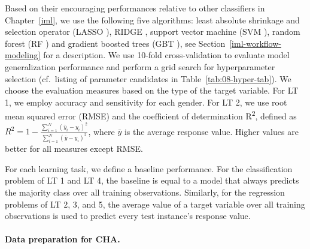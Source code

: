 \documentclass[
  oneside]{book}
\begin{document}
Based on their encouraging performances relative to other classifiers in Chapter~\ref{iml}, we use the following five algorithms:
least absolute shrinkage and selection operator (LASSO \autocite{lasso}),
RIDGE \autocite{ridge}, support vector machine (SVM \autocite{Boser:SVM1992}), random forest (RF \autocite{Breiman:RandomForests2001}) and gradient boosted trees (GBT \autocite{Friedman:PDP2001}), see Section~\ref{iml-workflow-modeling} for a description.
We use 10-fold cross-validation to evaluate model generalization performance and perform a grid search for hyperparameter selection (cf.~listing of parameter candidates in Table~\ref{tab:08-hyper-tab}).
We choose the evaluation measures based on the type of the target variable.
For LT 1, we employ accuracy and sensitivity for each gender.
For LT 2, we use root mean squared error (RMSE) and the coefficient of determination R\textsuperscript{2}, defined as \(R^2=1-\frac{\sum_{i=1}^N (\hat{y}_i-y_i)^2}{\sum_{i=1}^N(\bar{y}-y_i)^2}\), where \(\bar{y}\) is the average response value.
Higher values are better for all measures except RMSE.

For each learning task, we define a baseline performance.
For the classification problem of LT 1 and LT 4, the baseline is equal to a model that always predicts the majority class over all training observations.
Similarly, for the regression problems of LT 2, 3, and 5, the average value of a target variable over all training observations is used to predict every test instance's response value.

\paragraph*{Data preparation for CHA.}
\end{document}
